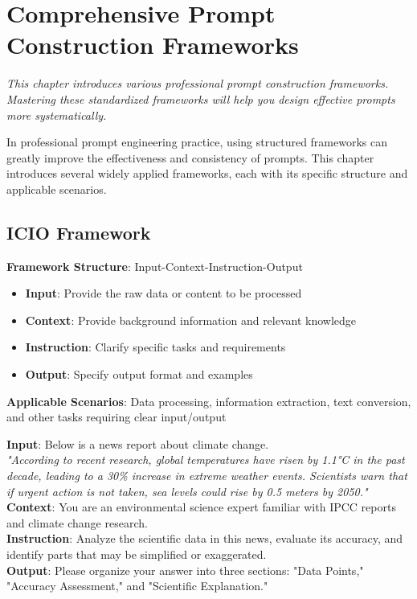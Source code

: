 \documentclass[12pt]{article}
\newcommand{\chapternote}[1]{\vspace{-0.3cm}\par\noindent\textit{\small #1}\vspace{0.3cm}}
\begin{document}
\section{Comprehensive Prompt Construction Frameworks}
\chapternote{This chapter introduces various professional prompt construction frameworks. Mastering these standardized frameworks will help you design effective prompts more systematically.}

In professional prompt engineering practice, using structured frameworks can greatly improve the effectiveness and consistency of prompts. This chapter introduces several widely applied frameworks, each with its specific structure and applicable scenarios.

\subsection{ICIO Framework}

\textbf{Framework Structure}: Input-Context-Instruction-Output

\begin{itemize}
  \item \textbf{Input}: Provide the raw data or content to be processed
  \item \textbf{Context}: Provide background information and relevant knowledge
  \item \textbf{Instruction}: Clarify specific tasks and requirements
  \item \textbf{Output}: Specify output format and examples
\end{itemize}

\textbf{Applicable Scenarios}: Data processing, information extraction, text conversion, and other tasks requiring clear input/output

\begin{promptbox}
\textbf{Input}: Below is a news report about climate change.\\
\textit{"According to recent research, global temperatures have risen by 1.1°C in the past decade, leading to a 30\% increase in extreme weather events. Scientists warn that if urgent action is not taken, sea levels could rise by 0.5 meters by 2050."}\\

\textbf{Context}: You are an environmental science expert familiar with IPCC reports and climate change research.\\

\textbf{Instruction}: Analyze the scientific data in this news, evaluate its accuracy, and identify parts that may be simplified or exaggerated.\\

\textbf{Output}: Please organize your answer into three sections: "Data Points," "Accuracy Assessment," and "Scientific Explanation."
\end{promptbox}
\end{document}
